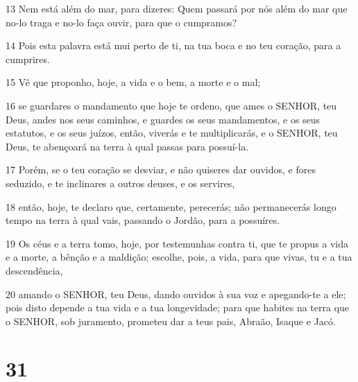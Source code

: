 \par 13 Nem está além do mar, para dizeres: Quem passará por nós além do mar que no-lo traga e no-lo faça ouvir, para que o cumpramos?
\par 14 Pois esta palavra está mui perto de ti, na tua boca e no teu coração, para a cumprires.
\par 15 Vê que proponho, hoje, a vida e o bem, a morte e o mal;
\par 16 se guardares o mandamento que hoje te ordeno, que ames o SENHOR, teu Deus, andes nos seus caminhos, e guardes os seus mandamentos, e os seus estatutos, e os seus juízos, então, viverás e te multiplicarás, e o SENHOR, teu Deus, te abençoará na terra à qual passas para possuí-la.
\par 17 Porém, se o teu coração se desviar, e não quiseres dar ouvidos, e fores seduzido, e te inclinares a outros deuses, e os servires,
\par 18 então, hoje, te declaro que, certamente, perecerás; não permanecerás longo tempo na terra à qual vais, passando o Jordão, para a possuíres.
\par 19 Os céus e a terra tomo, hoje, por testemunhas contra ti, que te propus a vida e a morte, a bênção e a maldição; escolhe, pois, a vida, para que vivas, tu e a tua descendência,
\par 20 amando o SENHOR, teu Deus, dando ouvidos à sua voz e apegando-te a ele; pois disto depende a tua vida e a tua longevidade; para que habites na terra que o SENHOR, sob juramento, prometeu dar a teus pais, Abraão, Isaque e Jacó.

\chapter{31}

